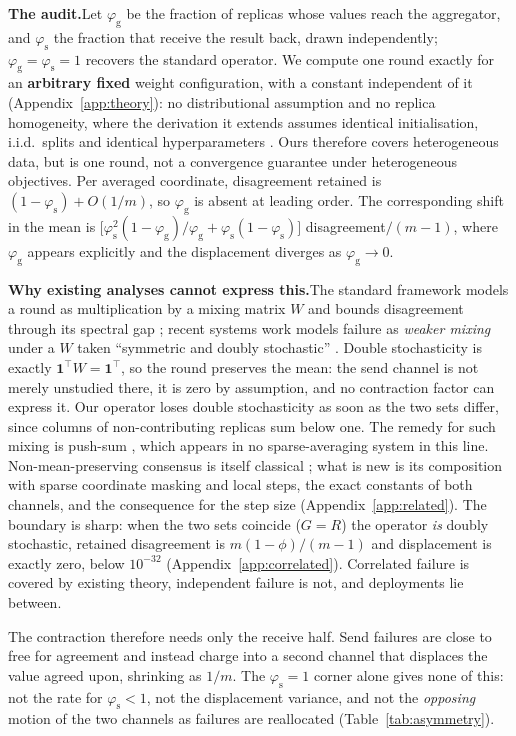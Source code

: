 \documentclass{article}
\theoremstyle{plain}
\newcommand{\pg}{\varphi_{\mathrm{g}}}
\newcommand{\ps}{\varphi_{\mathrm{s}}}
\begin{document}
\textbf{The audit.}\quad Let $\pg$ be the fraction of replicas whose values reach
the aggregator, and $\ps$ the fraction that receive the result back, drawn
independently; $\pg = \ps = 1$ recovers the standard operator. We compute one round
exactly for an \textbf{arbitrary fixed} weight configuration, with a constant
independent of it (Appendix~\ref{app:theory}): no distributional assumption and
no replica homogeneity, where the derivation it extends assumes identical
initialisation, i.i.d.\ splits and identical hyperparameters
\citep{ajanthan2026asyncmesh}. Ours therefore covers heterogeneous data, but is
one round, not a convergence guarantee under heterogeneous objectives. Per
averaged coordinate, disagreement retained is $(1-\ps) + O(1/m)$, so $\pg$ is
absent at leading order. The corresponding shift in the mean is
$\big[\ps^2(1-\pg)/\pg + \ps(1-\ps)\big]$ disagreement$/(m-1)$, where $\pg$
appears explicitly and the displacement diverges as $\pg \to 0$.

\textbf{Why existing analyses cannot express this.}\quad The standard framework
models a round as multiplication by a mixing matrix $W$ and bounds disagreement
through its spectral gap \citep{koloskova2020unified}; recent systems work models
failure as \emph{weaker mixing} under a $W$ taken ``symmetric and doubly
stochastic'' \citep{hewa2026factored}. Double stochasticity is exactly
$\mathbf{1}^\top W=\mathbf{1}^\top$, so the round preserves the mean: the send
channel is not merely unstudied there, it is zero by assumption, and no
contraction factor can express it. Our operator loses double stochasticity as
soon as the two sets differ, since columns of non-contributing replicas sum below
one. The remedy for such mixing is push-sum
\citep{kempe2003gossip,nedic2016pushsum,assran2019sgp}, which appears in no
sparse-averaging system in this line. Non-mean-preserving consensus is itself
classical \citep{fagnani2008randomized}; what is new is its composition with
sparse coordinate masking and local steps, the exact constants of both channels,
and the consequence for the step size (Appendix~\ref{app:related}). The
boundary is sharp: when the two sets coincide ($G=R$) the operator \emph{is}
doubly stochastic, retained disagreement is $m(1-\phi)/(m-1)$ and displacement is
exactly zero, below $10^{-32}$ (Appendix~\ref{app:correlated}). Correlated
failure is covered by existing theory, independent failure is not, and
deployments lie between.

The contraction therefore needs only the receive half. Send failures are close to
free for agreement and instead charge into a second channel that displaces the
value agreed upon, shrinking as $1/m$. The $\ps{=}1$ corner alone gives none of
this: not the rate for $\ps<1$, not the displacement variance, and not the
\emph{opposing} motion of the two channels as failures are reallocated
(Table~\ref{tab:asymmetry}).
\end{document}
